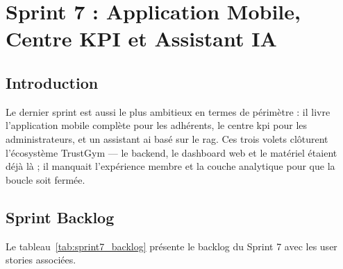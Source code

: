 ﻿\documentclass[../main.tex]{subfiles}
\begin{document}
\chapter{Sprint 7 : Application Mobile, Centre KPI et Assistant IA}

\section{Introduction}

Le dernier sprint est aussi le plus ambitieux en termes de p\'{e}rim\`{e}tre : il livre l'application mobile compl\`{e}te pour les adh\'{e}rents, le centre \acrshort{kpi} pour les administrateurs, et un assistant \acrshort{ai} bas\'{e} sur le \acrshort{rag}. Ces trois volets cl\^{o}turent l'\'{e}cosyst\`{e}me TrustGym --- le backend, le dashboard web et le mat\'{e}riel \'{e}taient d\'{e}j\`{a} l\`{a} ; il manquait l'exp\'{e}rience membre et la couche analytique pour que la boucle soit ferm\'{e}e.

\section{Sprint Backlog}

Le tableau~\ref{tab:sprint7_backlog} pr\'{e}sente le backlog du Sprint 7 avec les user stories associ\'{e}es.
\end{document}

